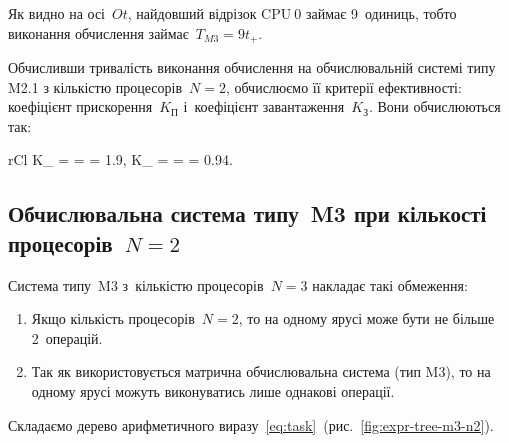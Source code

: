 \documentclass[
	a4paper,
	oneside,
	BCOR = 10mm,
	DIV = 12,
	12pt,
	headings = normal,
]{scrartcl}
\begin{document}
				Як видно на осі~$Ot$, найдовший відрізок $\text{CPU}~0$ займає 9~одиниць, тобто виконання обчислення займає~$T_{M3} = 9t_{+}$.

				Обчисливши тривалість виконання обчислення на обчислювальній системі типу M2.1 з кількістю процесорів~$N = 2$, обчислюємо її критерії ефективності: коефіцієнт прискорення~$K_{\text{П}}$ і~коефіцієнт завантаження~$K_{\text{З}}$. Вони обчислюються так:
				\begin{IEEEeqnarray*}{rCl}
					K_{} =  =  = \num{1.9}, \quad
					K_{} =  =  = \num{0.94}.
				\end{IEEEeqnarray*}

			\subsection{Обчислювальна система типу~M3 при кількості процесорів~$N = 2$}
				Система типу~M3 з~кількістю процесорів~$N = 3$ накладає такі обмеження:
				\begin{enumerate}
					\item Якщо кількість процесорів~$N = 2$, то на одному ярусі може бути не більше 2~операцій.
					\item Так як використовується матрична обчислювальна система (тип M3), то на одному ярусі можуть виконуватись лише однакові операції.
				\end{enumerate}
				Складаємо дерево арифметичного виразу~\eqref{eq:task}~(рис.~\ref{fig:expr-tree-m3-n2}).
\end{document}
